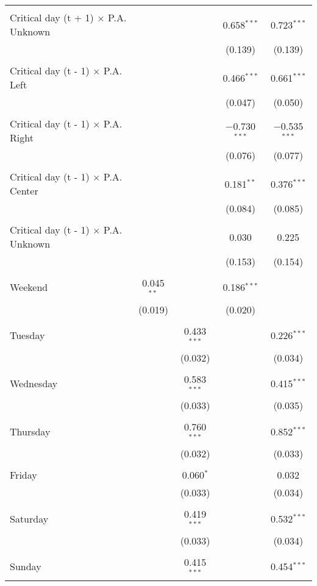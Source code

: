 \documentclass[
]{article}
\begin{document}
\begin{table}[!htbp]
{\begin{tabular}{@{\extracolsep{5pt}}lcccc}
  & & & & \\ 
 Critical day (t + 1) $\times$ P.A. Unknown &  &  & 0.658$^{***}$ & 0.723$^{***}$ \\ 
  &  &  & (0.139) & (0.139) \\ 
  & & & & \\ 
 Critical day (t - 1) $\times$ P.A. Left &  &  & 0.466$^{***}$ & 0.661$^{***}$ \\ 
  &  &  & (0.047) & (0.050) \\ 
  & & & & \\ 
 Critical day (t - 1) $\times$ P.A. Right &  &  & $-$0.730$^{***}$ & $-$0.535$^{***}$ \\ 
  &  &  & (0.076) & (0.077) \\ 
  & & & & \\ 
 Critical day (t - 1) $\times$ P.A. Center &  &  & 0.181$^{**}$ & 0.376$^{***}$ \\ 
  &  &  & (0.084) & (0.085) \\ 
  & & & & \\ 
 Critical day (t - 1) $\times$ P.A. Unknown &  &  & 0.030 & 0.225 \\ 
  &  &  & (0.153) & (0.154) \\ 
  & & & & \\ 
 Weekend & 0.045$^{**}$ &  & 0.186$^{***}$ &  \\ 
  & (0.019) &  & (0.020) &  \\ 
  & & & & \\ 
 Tuesday &  & 0.433$^{***}$ &  & 0.226$^{***}$ \\ 
  &  & (0.032) &  & (0.034) \\ 
  & & & & \\ 
 Wednesday &  & 0.583$^{***}$ &  & 0.415$^{***}$ \\ 
  &  & (0.033) &  & (0.035) \\ 
  & & & & \\ 
 Thursday &  & 0.760$^{***}$ &  & 0.852$^{***}$ \\ 
  &  & (0.032) &  & (0.033) \\ 
  & & & & \\ 
 Friday &  & 0.060$^{*}$ &  & 0.032 \\ 
  &  & (0.033) &  & (0.034) \\ 
  & & & & \\ 
 Saturday &  & 0.419$^{***}$ &  & 0.532$^{***}$ \\ 
  &  & (0.033) &  & (0.034) \\ 
  & & & & \\ 
 Sunday &  & 0.415$^{***}$ &  & 0.454$^{***}$ \\ 

\end{tabular}}
\end{table}
\end{document}
